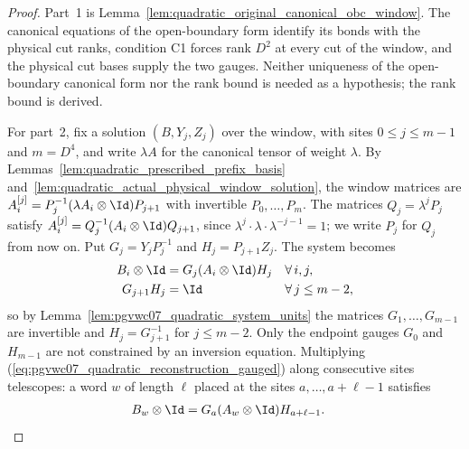 \begin{proof}
    \leanok
    Part~1 is Lemma~\ref{lem:quadratic_original_canonical_obc_window}. The
    canonical equations of the open-boundary form identify its bonds with
    the physical cut ranks, condition C1 forces rank $D^2$ at every cut of
    the window, and the physical cut bases supply the two gauges. Neither
    uniqueness of the open-boundary canonical form nor the rank bound is
    needed as a hypothesis; the rank bound is derived.

    For part~2, fix a solution $(B,Y_j,Z_j)$ over the window, with sites
    $0\le j\le m-1$ and $m=D^4$, and write $\lambda A$ for the canonical
    tensor of weight $\lambda$. By
    Lemmas~\ref{lem:quadratic_prescribed_prefix_basis}
    and~\ref{lem:quadratic_actual_physical_window_solution}, the window
    matrices are $A^{[j]}_i=P_j^{-1}(\lambda A_i\otimes\Id)P_{j+1}$ with
    invertible $P_0,\ldots,P_m$. The matrices $Q_j=\lambda^{j}P_j$ satisfy
    $A^{[j]}_i=Q_j^{-1}(A_i\otimes\Id)Q_{j+1}$, since
    $\lambda^{j}\cdot\lambda\cdot\lambda^{-j-1}=1$; we write $P_j$ for $Q_j$
    from now on. Put $G_j=Y_jP_j^{-1}$ and
    $H_j=P_{j+1}Z_j$. The system
    becomes
    \begin{align}
        B_i\otimes\Id & =G_j(A_i\otimes\Id)H_j &  & \forall\,i,j,
        \label{eq:pgvwc07_quadratic_reconstruction_gauged}             \\
        G_{j+1}H_j    & =\Id                   &  & \forall\,j\le m-2,
        \label{eq:pgvwc07_quadratic_reconstruction_gauged_inverse}
    \end{align}
    so by Lemma~\ref{lem:pgvwc07_quadratic_system_units} the matrices
    $G_1,\ldots,G_{m-1}$ are invertible and $H_j=G_{j+1}^{-1}$ for
    $j\le m-2$. Only the endpoint gauges $G_0$ and $H_{m-1}$ are not
    constrained by an inversion equation. Multiplying
    (\ref{eq:pgvwc07_quadratic_reconstruction_gauged}) along consecutive
    sites telescopes: a word $w$ of length $\ell$ placed at the sites
    $a,\ldots,a+\ell-1$ satisfies
    \begin{align}
        B_w\otimes\Id & =G_a(A_w\otimes\Id)H_{a+\ell-1}.
        \label{eq:pgvwc07_quadratic_reconstruction_words}
    \end{align}


\end{proof}
